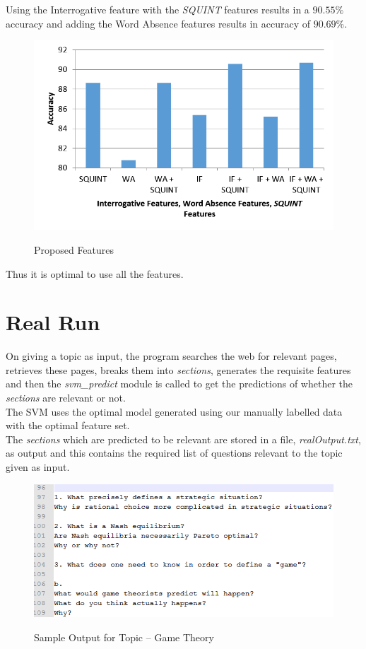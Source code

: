 \documentclass[a4paper,10pt]{report}
\begin{document}
Using the Interrogative feature with the \emph{SQUINT} features results in a $90.55\%$ accuracy and adding the Word Absence features results in accuracy of $90.69\%$.

\begin{figure}[h!]
\centering
\includegraphics[width=\textwidth]{./diagrams/ourfeatures}\\
\caption{Proposed Features}
\end{figure}

\noindent Thus it is optimal to use all the features.
\clearpage

\section{Real Run}

On giving a topic as input, the program searches the web for relevant pages, retrieves these pages, breaks them into \emph{sections}, generates the requisite features and then the \emph{svm\_predict} module is called to get the predictions of whether the \emph{sections} are relevant or not. \\

\noindent The SVM uses the optimal model generated using our manually labelled data with the optimal feature set.\\

\noindent The \emph{sections} which are predicted to be relevant are stored in a file, \emph{realOutput.txt}, as output and this contains the required list of questions relevant to the topic given as input.

\begin{figure}[h!]
\centering
\includegraphics[width=\textwidth]{./diagrams/realrun}\\
\caption{Sample Output for Topic -- Game Theory}
\end{figure}
\end{document}
